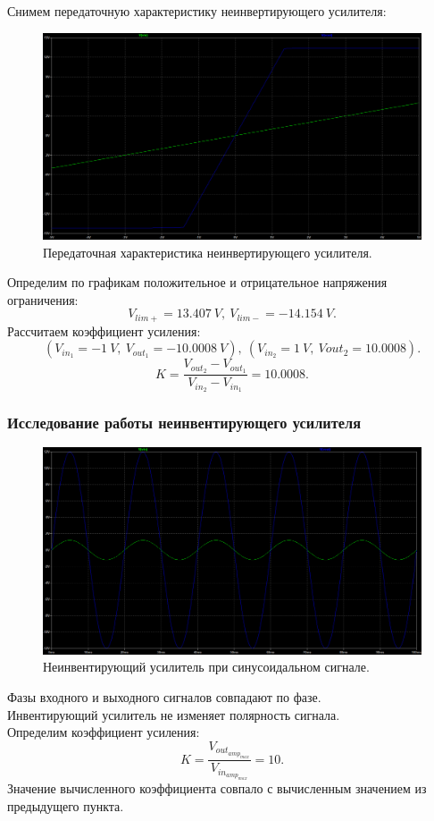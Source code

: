 \documentclass[12pt]{article}
\begin{document}
Снимем передаточную характеристику неинвертирующего усилителя:
\begin{figure}[H]
    \centering
    \includegraphics[width=\textwidth]{2_in_out.png}
    \caption{Передаточная характеристика неинвертирующего усилителя.}
    \label{fig:2_in_out}
\end{figure}

Определим по графикам положительное и отрицательное напряжения ограничения:
\[
    V_{lim+} = 13.407 \ V, \ V_{lim-} = -14.154 \ V.
\]
Рассчитаем коэффициент усиления:
\[
    (V_{in_1} = -1 \ V, \ V_{out_1} = -10.0008 \ V), \ (V_{in_2} = 1 \ V, \ V{out_2} = 10.0008).
\]
\[
    K = \frac{V_{out_2} - V_{out_1}}{V_{in_2} - V_{in_1}} = 10.0008.
\]

\subsubsection*{Исследование работы неинвентирующего усилителя}
\begin{figure}[H]
    \centering
    \includegraphics[width=\textwidth]{2_sin_in_out.png}
    \caption{Неинвентирующий усилитель при синусоидальном сигнале.}
    \label{fig:2_sin_in_out}
\end{figure}
Фазы входного и выходного сигналов совпадают по фазе. \\
Инвентирующий усилитель не изменяет полярность сигнала. \\
Определим коэффициент усиления:
\[
    K = \frac{V_{out_{amp_{max}}}}{V_{in_{amp_{max}}}} = 10.
\]
Значение вычисленного коэффициента совпало с вычисленным значением из предыдущего пункта.
\end{document}
